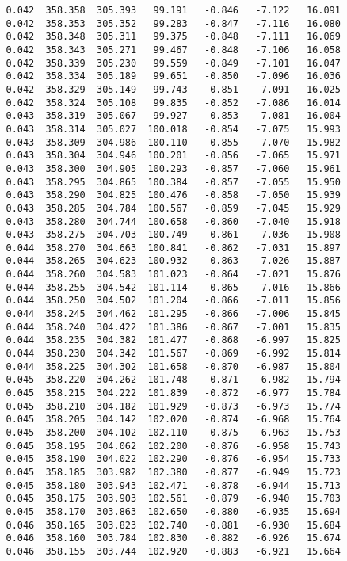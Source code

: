 \begin{verbatim}
   0.042  358.358  305.393   99.191   -0.846   -7.122   16.091
   0.042  358.353  305.352   99.283   -0.847   -7.116   16.080
   0.042  358.348  305.311   99.375   -0.848   -7.111   16.069
   0.042  358.343  305.271   99.467   -0.848   -7.106   16.058
   0.042  358.339  305.230   99.559   -0.849   -7.101   16.047
   0.042  358.334  305.189   99.651   -0.850   -7.096   16.036
   0.042  358.329  305.149   99.743   -0.851   -7.091   16.025
   0.042  358.324  305.108   99.835   -0.852   -7.086   16.014
   0.043  358.319  305.067   99.927   -0.853   -7.081   16.004
   0.043  358.314  305.027  100.018   -0.854   -7.075   15.993
   0.043  358.309  304.986  100.110   -0.855   -7.070   15.982
   0.043  358.304  304.946  100.201   -0.856   -7.065   15.971
   0.043  358.300  304.905  100.293   -0.857   -7.060   15.961
   0.043  358.295  304.865  100.384   -0.857   -7.055   15.950
   0.043  358.290  304.825  100.476   -0.858   -7.050   15.939
   0.043  358.285  304.784  100.567   -0.859   -7.045   15.929
   0.043  358.280  304.744  100.658   -0.860   -7.040   15.918
   0.043  358.275  304.703  100.749   -0.861   -7.036   15.908
   0.044  358.270  304.663  100.841   -0.862   -7.031   15.897
   0.044  358.265  304.623  100.932   -0.863   -7.026   15.887
   0.044  358.260  304.583  101.023   -0.864   -7.021   15.876
   0.044  358.255  304.542  101.114   -0.865   -7.016   15.866
   0.044  358.250  304.502  101.204   -0.866   -7.011   15.856
   0.044  358.245  304.462  101.295   -0.866   -7.006   15.845
   0.044  358.240  304.422  101.386   -0.867   -7.001   15.835
   0.044  358.235  304.382  101.477   -0.868   -6.997   15.825
   0.044  358.230  304.342  101.567   -0.869   -6.992   15.814
   0.044  358.225  304.302  101.658   -0.870   -6.987   15.804
   0.045  358.220  304.262  101.748   -0.871   -6.982   15.794
   0.045  358.215  304.222  101.839   -0.872   -6.977   15.784
   0.045  358.210  304.182  101.929   -0.873   -6.973   15.774
   0.045  358.205  304.142  102.020   -0.874   -6.968   15.764
   0.045  358.200  304.102  102.110   -0.875   -6.963   15.753
   0.045  358.195  304.062  102.200   -0.876   -6.958   15.743
   0.045  358.190  304.022  102.290   -0.876   -6.954   15.733
   0.045  358.185  303.982  102.380   -0.877   -6.949   15.723
   0.045  358.180  303.943  102.471   -0.878   -6.944   15.713
   0.045  358.175  303.903  102.561   -0.879   -6.940   15.703
   0.045  358.170  303.863  102.650   -0.880   -6.935   15.694
   0.046  358.165  303.823  102.740   -0.881   -6.930   15.684
   0.046  358.160  303.784  102.830   -0.882   -6.926   15.674
   0.046  358.155  303.744  102.920   -0.883   -6.921   15.664

\end{verbatim}
